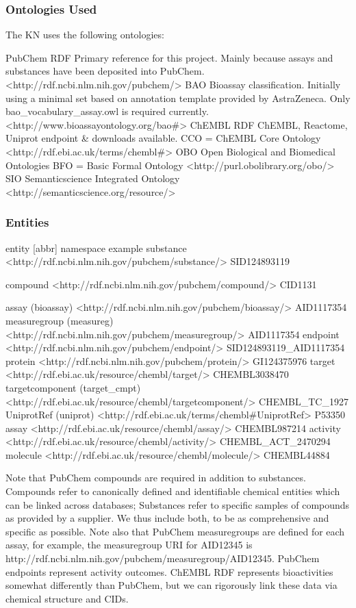 \subsubsection{Ontologies Used}

The KN uses the following ontologies:

PubChem RDF
Primary reference for this project.  Mainly because assays and substances have been deposited into PubChem. 
<http://rdf.ncbi.nlm.nih.gov/pubchem/>
BAO
Bioassay classification.  Initially using a minimal set based on annotation template provided by AstraZeneca.  Only bao\_vocabulary\_assay.owl is required currently.
<http://www.bioassayontology.org/bao\#>
ChEMBL RDF
ChEMBL, Reactome, Uniprot endpoint \& downloads available.
CCO = ChEMBL Core Ontology
<http://rdf.ebi.ac.uk/terms/chembl\#>
OBO
Open Biological and Biomedical Ontologies
BFO = Basic Formal Ontology
<http://purl.obolibrary.org/obo/>
SIO
Semanticscience Integrated Ontology
<http://semanticscience.org/resource/>


\subsubsection{Entities}

entity [abbr] namespace
example
substance
<http://rdf.ncbi.nlm.nih.gov/pubchem/substance/>
SID124893119


compound
<http://rdf.ncbi.nlm.nih.gov/pubchem/compound/>
CID1131


assay (bioassay)
<http://rdf.ncbi.nlm.nih.gov/pubchem/bioassay/>
AID1117354
measuregroup (measureg)
<http://rdf.ncbi.nlm.nih.gov/pubchem/measuregroup/>
AID1117354
endpoint
<http://rdf.ncbi.nlm.nih.gov/pubchem/endpoint/>
SID124893119\_AID1117354
protein
<http://rdf.ncbi.nlm.nih.gov/pubchem/protein/>
GI124375976
target
<http://rdf.ebi.ac.uk/resource/chembl/target/>
CHEMBL3038470
targetcomponent (target\_cmpt)
<http://rdf.ebi.ac.uk/resource/chembl/targetcomponent/>
CHEMBL\_TC\_1927
UniprotRef (uniprot)
<http://rdf.ebi.ac.uk/terms/chembl\#UniprotRef>
P53350
assay
<http://rdf.ebi.ac.uk/resource/chembl/assay/>
CHEMBL987214
activity
<http://rdf.ebi.ac.uk/resource/chembl/activity/>
CHEMBL\_ACT\_2470294
molecule
<http://rdf.ebi.ac.uk/resource/chembl/molecule/>
CHEMBL44884

Note that PubChem compounds are required in addition to substances.  Compounds refer to canonically defined and identifiable chemical entities which can be linked across databases; Substances refer to specific samples of compounds as provided by a supplier.  We thus include both, to be as comprehensive and specific as possible.   Note also that PubChem measuregroups are defined for each assay, for example, the measuregroup URI for AID12345 is http://rdf.ncbi.nlm.nih.gov/pubchem/measuregroup/AID12345.  PubChem endpoints represent activity outcomes.  ChEMBL RDF represents bioactivities somewhat differently than PubChem, but we can rigorously link these data via chemical structure and CIDs.


